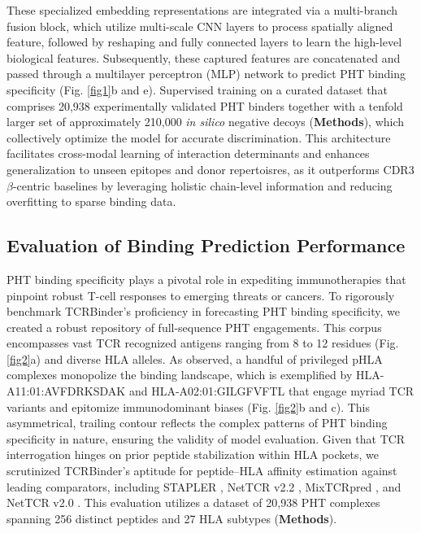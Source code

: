 \documentclass[10pt,letterpaper]{article}
\begin{document}
These specialized embedding representations are integrated via a multi-branch fusion block, which utilize multi-scale CNN layers to process spatially aligned feature, followed by reshaping and fully connected layers to learn the high-level biological features. Subsequently, these captured features are concatenated and passed through a multilayer perceptron (MLP) network to predict PHT binding specificity (Fig. \ref{fig1}b and e). Supervised training on a curated dataset that comprises 20,938 experimentally validated PHT binders together with a tenfold larger set of approximately 210,000 \textit{in silico} negative decoys (\textbf{Methods}), which collectively optimize the model for accurate discrimination. This architecture facilitates cross-modal learning of interaction determinants and enhances generalization to unseen epitopes and donor repertoisres, as it outperforms CDR3$\beta$-centric baselines by leveraging holistic chain-level information and reducing overfitting to sparse binding data.


\subsection*{Evaluation of Binding Prediction Performance}
PHT binding specificity plays a pivotal role in expediting immunotherapies that pinpoint robust T-cell responses to emerging threats or cancers. To rigorously benchmark TCRBinder's proficiency in forecasting PHT binding specificity,  we created a robust repository of full-sequence PHT engagements. This corpus encompasses vast TCR recognized antigens ranging from 8 to 12 residues (Fig. \ref{fig2}a) and diverse HLA alleles. As observed, a handful of privileged pHLA complexes monopolize the binding landscape, which is exemplified by HLA-A11:01:AVFDRKSDAK and HLA-A02:01:GILGFVFTL that engage myriad TCR variants and epitomize immunodominant biases (Fig. \ref{fig2}b and c). This asymmetrical, trailing contour reflects the complex patterns of PHT binding specificity in nature, ensuring the validity of model evaluation. Given that TCR interrogation hinges on prior peptide stabilization within HLA pockets, we scrutinized TCRBinder's aptitude for peptide–HLA affinity estimation against leading comparators, including STAPLER \cite{ref37}, NetTCR v2.2 \cite{ref38}, MixTCRpred \cite{ref39}, and NetTCR v2.0 \cite{ref40}. This evaluation utilizes a dataset of 20,938 PHT complexes spanning 256 distinct peptides and 27 HLA subtypes (\textbf{Methods}).
\end{document}
